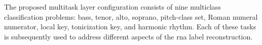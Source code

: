 
The proposed multitask layer configuration consists of nine
multiclass classification problems: bass, tenor, alto,
soprano, pitch-class set, Roman numeral numerator, local
key, tonicization key, and harmonic rhythm. Each of these
tasks is subsequently used to address different aspects of
the \gls{rna} label reconstruction.

